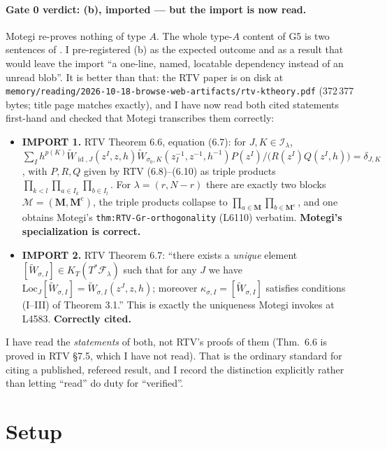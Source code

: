 \documentclass[11pt]{article}
\theoremstyle{plain}
\theoremstyle{definition}
\theoremstyle{remark}
\newcommand{\bM}{\mathbf M}
\newcommand{\cm}{{\mathrm c}}
\DeclareMathOperator{\id}{id}
\begin{document}
\paragraph{Gate 0 verdict: (b), imported --- but the import is now read.}
Motegi re-proves nothing of type $A$. The whole type-$A$ content of G5 is two
sentences of \cite{RTV}. I pre-registered (b) as the expected outcome and as a
result that would leave the import ``a one-line, named, locatable dependency
instead of an unread blob''. It is better than that: the RTV paper is on disk at
\texttt{memory/reading/2026-10-18-browse-web-artifacts/rtv-ktheory.pdf} (372\,377
bytes; title page matches \cite{RTV} exactly), and I have now read both cited
statements first-hand and checked that Motegi transcribes them correctly:

\begin{itemize}[itemsep=2pt]
\item \textbf{IMPORT 1.} RTV Theorem 6.6, equation (6.7): for $J,K\in\mathcal I_\lambda$,
$\sum_{I}h^{p(K)}\widetilde W_{\id,J}(z^I,z,h)\widetilde W_{\sigma_0,K}(z_I^{-1},z^{-1},h^{-1})
 P(z^I)/\bigl(R(z^I)Q(z^I,h)\bigr)=\delta_{J,K}$,
with $P,R,Q$ given by RTV (6.8)--(6.10) as triple products
$\prod_{k<l}\prod_{a\in I_k}\prod_{b\in I_l}$.
For $\lambda=(r,N-r)$ there are exactly two blocks
$\mathcal M=(\bM,\bM^\cm)$, the triple products collapse to
$\prod_{a\in\bM}\prod_{b\in\bM^\cm}$, and one obtains Motegi's \texttt{thm:RTV-Gr-orthogonality} (L6110) verbatim. \textbf{Motegi's specialization is correct.}
\item \textbf{IMPORT 2.} RTV Theorem 6.7: ``there exists a \emph{unique} element
$[\widetilde W_{\sigma,I}]\in K_T(T^*\mathcal F_\lambda)$ such that for any
$J$ we have $\mathrm{Loc}_J[\widetilde W_{\sigma,I}]=\widetilde W_{\sigma,I}(z^J,z,h)$;
moreover $\kappa_{\sigma,I}=[\widetilde W_{\sigma,I}]$ satisfies conditions
(I--III) of Theorem 3.1.'' This is exactly the uniqueness Motegi invokes at L4583.
\textbf{Correctly cited.}
\end{itemize}

\noindent
I have read the \emph{statements} of both, not RTV's proofs of them (Thm.~6.6 is
proved in RTV \S7.5, which I have not read). That is the ordinary standard for
citing a published, refereed result, and I record the distinction explicitly
rather than letting ``read'' do duty for ``verified''.

\section{Setup}
\label{sec:setup}
\end{document}
